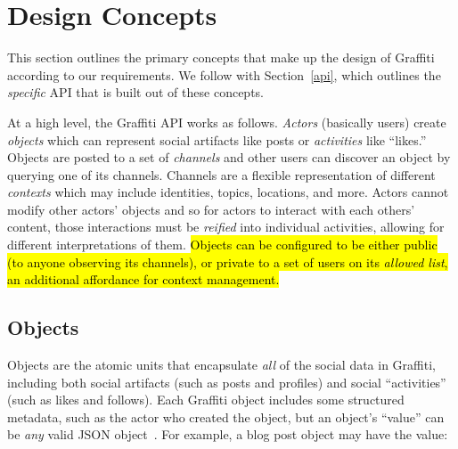 \section{Design Concepts}
\label{concepts}

This section outlines the primary concepts that make up the design of Graffiti
according to our requirements.
We follow with Section~\ref{api}, which outlines the \emph{specific} API that is built out of these
concepts.

At a high level, the Graffiti API works as follows.
\emph{Actors} (basically users) create \emph{objects} which can represent
social artifacts like posts or \emph{activities} like ``likes.''
Objects are posted to a set of \emph{channels} and other users can
discover an object by querying one of its channels. Channels are a flexible representation
of different \emph{contexts} which may include identities, topics, locations,
and more.
Actors cannot modify other actors' objects and so for actors to interact with each others' content,
those interactions must be \emph{reified} into individual
activities, %
allowing for different interpretations of them.
\hl{%
Objects can be configured to be either public
(to anyone observing its channels),
or private to a set of users on its \emph{allowed list},
an additional affordance for context management.
}%



\subsection{Objects}
\label{concepts:objects}

Objects are the atomic units that encapsulate \emph{all}
of the social data in Graffiti, including
both social artifacts (such as posts and profiles) and social ``activities'' (such as likes and follows).
Each Graffiti object includes some structured metadata,
such as the actor who created the object,
but an object's ``value'' can be \emph{any} valid JSON object~\cite{json}.
For example, a blog post object may have the value:

